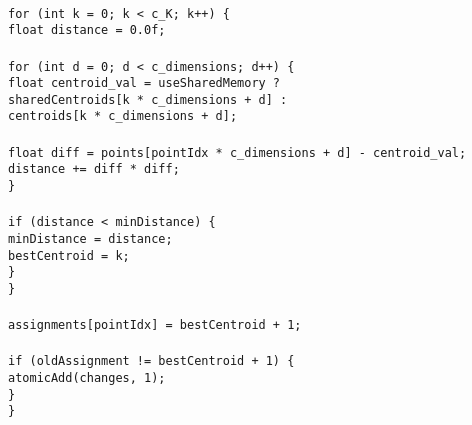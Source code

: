 \documentclass[12pt,a4paper]{article}
\begin{document}
\begin{algorithm}[H]
\begin{flushleft}
\\
\hspace{1cm}\texttt{for (int k = 0; k < c\_K; k++) \{}\\
\hspace{2cm}\texttt{float distance = 0.0f;}\\
\\
\hspace{2cm}\texttt{for (int d = 0; d < c\_dimensions; d++) \{}\\
\hspace{3cm}\texttt{float centroid\_val = useSharedMemory ?}\\
\hspace{4cm}\texttt{sharedCentroids[k * c\_dimensions + d] :}\\
\hspace{4cm}\texttt{centroids[k * c\_dimensions + d];}\\
\\
\hspace{3cm}\texttt{float diff = points[pointIdx * c\_dimensions + d] - centroid\_val;}\\
\hspace{3cm}\texttt{distance += diff * diff;}\\
\hspace{2cm}\texttt{\}}\\
\\
\hspace{2cm}\texttt{if (distance < minDistance) \{}\\
\hspace{3cm}\texttt{minDistance = distance;}\\
\hspace{3cm}\texttt{bestCentroid = k;}\\
\hspace{2cm}\texttt{\}}\\
\hspace{1cm}\texttt{\}}\\
\\
\hspace{1cm}\texttt{assignments[pointIdx] = bestCentroid + 1;}\\
\\
\hspace{1cm}\texttt{if (oldAssignment != bestCentroid + 1) \{}\\
\hspace{2cm}\texttt{atomicAdd(changes, 1);}\\
\hspace{1cm}\texttt{\}}\\
\texttt{\}}
\end{flushleft}
\end{algorithm}
\end{document}

